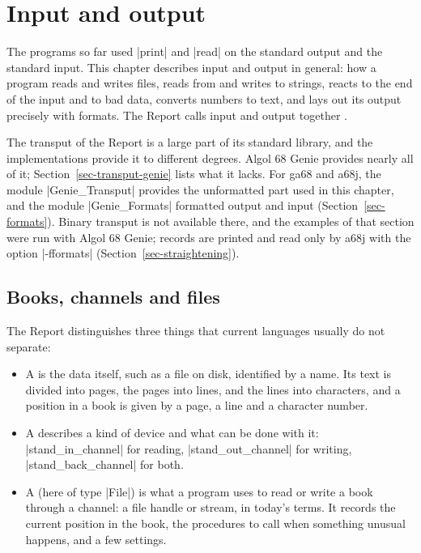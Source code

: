 \chapter{Input and output}\label{ch-transput}

The programs so far used \code|print| and \code|read| on the standard
output and the standard input. This chapter describes input and output
in general: how a program reads and writes files, reads from and writes to
strings, reacts to the end of the input and to bad data, converts numbers
to text, and lays out its output precisely with formats. The Report
calls input and output together .

The transput of the Report is a large part of its standard library, and
the implementations provide it to different degrees. Algol 68 Genie
provides nearly all of it; Section~\ref{sec-transput-genie} lists what it
lacks. For ga68 and a68j, the module \code|Genie_Transput| provides the
unformatted part used in this chapter, and the module
\code|Genie_Formats| formatted output and input
(Section~\ref{sec-formats}). Binary transput is not available there, and
the examples of that section were run with Algol 68 Genie; records are
printed and read only by a68j with the option \code|-fformats|
(Section~\ref{sec-straightening}).

\section{Books, channels and files}\label{sec-books}

The Report distinguishes three things that current languages usually do
not separate:
\begin{itemize}
\item A  is the data itself, such as a file on disk, identified
  by a name. Its text is divided into pages, the pages into lines, and
  the lines into characters, and a position in a book is given by a page,
  a line and a character number.
\item A  describes a kind of device and what can be done with
  it: \code|stand_in_channel| for reading, \code|stand_out_channel| for
  writing, \code|stand_back_channel| for both.
\item A  (here of type \code|File|) is what a program uses to
  read or write a book through a channel: a file handle or stream, in
  today's terms. It records the current position in the book, the
  procedures to call when something unusual happens, and a few settings.
\end{itemize}

